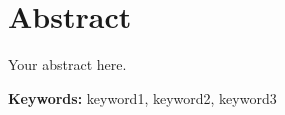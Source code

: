 \chapter*{Abstract}


Your abstract here.

\vspace{1cm}
\textbf{Keywords:} keyword1, keyword2, keyword3
